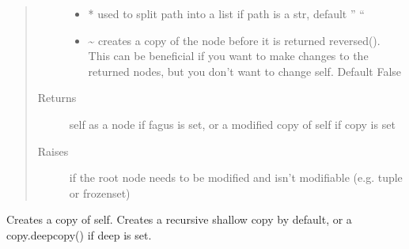 \documentclass[a4paper,10pt,english]{sphinxmanual}
\begin{document}
\begin{fulllineitems}
\begin{fulllineitems}
\begin{quote}
\begin{description}
\begin{itemize}
\item {}
\sphinxAtStartPar
{} \textendash{} * used to split path into a list if path is a str, default ” “

\item {}
\sphinxAtStartPar
{} \textendash{} \textasciitilde{} creates a copy of the node before it is returned reversed(). This can be beneficial if you want to
make changes to the returned nodes, but you don’t want to change self. Default False

\end{itemize}

\item[{Returns}] \leavevmode
\sphinxAtStartPar
self as a node if fagus is set, or a modified copy of self if copy is set

\item[{Raises}] \leavevmode
\sphinxAtStartPar
{} \textendash{} if the root node needs to be modified and isn’t modifiable (e.g. tuple or frozenset)

\end{description}\end{quote}

\end{fulllineitems}


\begin{fulllineitems}
\label{\detokenize{fagus:fagus.Fagus.copy}}
\pysigstartsignatures
{}
\pysigstopsignatures
\sphinxAtStartPar
Creates a copy of self. Creates a recursive shallow copy by default, or a copy.deepcopy() if deep is set.

\end{fulllineitems}



\end{fulllineitems}
\end{document}
